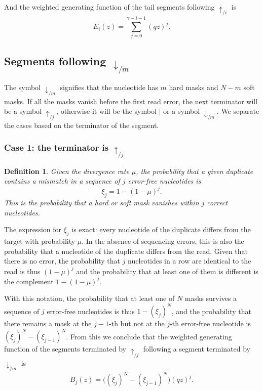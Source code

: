 \documentclass{article}
\newtheorem{definition}{Definition}
\begin{document}
And the weighted generating function of the tail segments following
$\uparrow_{/i}$ is
\begin{equation}
\label{eq:E}
E_i(z) = \sum_{j=0}^{\gamma-i-1} (qz)^j.
\end{equation}


\subsection{Segments following $\downarrow_{/m}$}

The symbol $\downarrow_{/m}$ signifies that the nucleotide has $m$ hard
masks and $N-m$ soft masks. If all the masks vanish before the first read
error, the next terminator will be a symbol $\uparrow_{/j}$, otherwise it
will be the symbol $|$ or a symbol $\downarrow_{/m}$. We separate the
cases based on the terminator of the segment.

\subsubsection*{Case 1: the terminator is $\uparrow_{/j}$}

\begin{definition}
Given the divergence rate $\mu$, the probability that a given duplicate
contains a mismatch in a sequence of $j$ error-free nucleotides is
\begin{equation}
\label{eq:xi}
\xi_j = 1-(1-\mu)^j.
\end{equation}
This is the probability that a hard or soft mask vanishes within $j$
correct nucleotides.
\end{definition}

The expression for $\xi_j$ is exact: every nucleotide of the duplicate
differs from the target with probability $\mu$. In the absence of
sequencing errors, this is also the probability that a nucleotide of the
duplicate differs from the read. Given that there is no error, the
probability that $j$ nucleotides in a row are identical to the read is
thus $(1-\mu)^j$ and the probability that at least one of them is
different is the complement $1-(1-\mu)^j$.

With this notation, the probability that at least one of $N$ masks
survives a sequence of $j$ error-free nucleotides is thus $1-(\xi_j)^N$,
and the probability that there remains a mask at the $j-1$-th but not at
the $j$-th error-free nucleotide is $(\xi_j)^N - (\xi_{j-1})^N$. From this
we conclude that the weighted generating function of the segments
terminated by $\uparrow_{/j}$ following a segment terminated by
$\downarrow_{/m}$ is
\begin{equation}
\label{eq:B}
B_j(z) = \Big( (\xi_j)^N-(\xi_{j-1})^N \Big) (qz)^j.
\end{equation}
\end{document}
